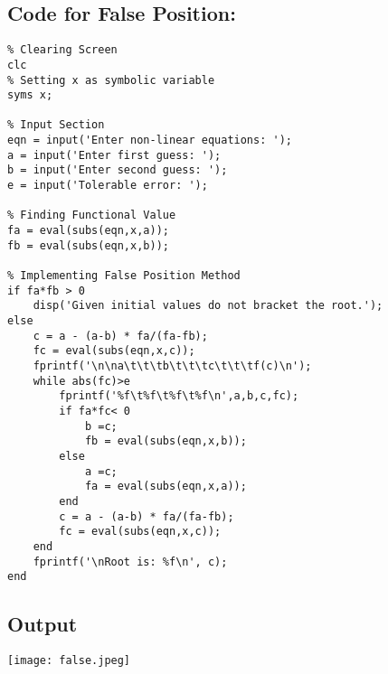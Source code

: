 \subsection*{Code for False Position:}
\begin{verbatim}
% Clearing Screen
clc
% Setting x as symbolic variable
syms x;

% Input Section
eqn = input('Enter non-linear equations: ');
a = input('Enter first guess: ');
b = input('Enter second guess: ');
e = input('Tolerable error: ');

% Finding Functional Value
fa = eval(subs(eqn,x,a));
fb = eval(subs(eqn,x,b));

% Implementing False Position Method
if fa*fb > 0 
    disp('Given initial values do not bracket the root.');
else
    c = a - (a-b) * fa/(fa-fb);
    fc = eval(subs(eqn,x,c));
    fprintf('\n\na\t\t\tb\t\t\tc\t\t\tf(c)\n');
    while abs(fc)>e
        fprintf('%f\t%f\t%f\t%f\n',a,b,c,fc);
        if fa*fc< 0
            b =c;
            fb = eval(subs(eqn,x,b));
        else
            a =c;
            fa = eval(subs(eqn,x,a));
        end
        c = a - (a-b) * fa/(fa-fb);
        fc = eval(subs(eqn,x,c));
    end
    fprintf('\nRoot is: %f\n', c);
end
\end{verbatim}

\subsection*{Output}
\begin{center}
    \centering
    \texttt{[image: false.jpeg]}
\end{center}




